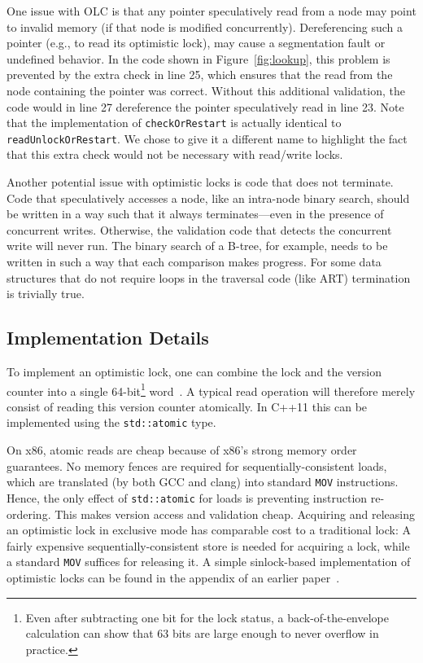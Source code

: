 \documentclass[11pt]{article}
\begin{document}
One issue with OLC is that any pointer speculatively read from a node may point to invalid memory (if that node is modified concurrently).
Dereferencing such a pointer (e.g., to read its optimistic lock), may cause a segmentation fault or undefined behavior.
In the code shown in Figure~\ref{fig:lookup}, this problem is prevented by the extra check in line 25, which ensures that the read from the node containing the pointer was correct.
Without this additional validation, the code would in line 27 dereference the pointer speculatively read in line 23.
Note that the implementation of \texttt{checkOrRestart} is actually identical to \texttt{readUnlockOrRestart}.
We chose to give it a different name to highlight the fact that this extra check would not be necessary with read/write locks.

Another potential issue with optimistic locks is code that does not terminate.
Code that speculatively accesses a node, like an intra-node binary search, should be written in a way such that it always terminates---even in the presence of concurrent writes.
Otherwise, the validation code that detects the concurrent write will never run.
The binary search of a B-tree, for example, needs to be written in such a way that each comparison makes progress.
For some data structures that do not require loops in the traversal code (like ART) termination is trivially true.

\subsection{Implementation Details}

To implement an optimistic lock, one can combine the lock and the version counter into a single 64-bit\footnote{Even after subtracting one bit for the lock status, a back-of-the-envelope calculation can show that 63 bits are large enough to never overflow in practice.} word~\cite{artsync}.
A typical read operation will therefore merely consist of reading this version counter atomically.
In C++11 this can be implemented using the \texttt{std::atomic} type.

On x86, atomic reads are cheap because of x86's strong memory order guarantees.
No memory fences are required for sequentially-consistent loads, which are translated (by both GCC and clang) into standard \texttt{MOV} instructions.
Hence, the only effect of \texttt{std::atomic} for loads is preventing instruction re-ordering.
This makes version access and validation cheap.
Acquiring and releasing an optimistic lock in exclusive mode has comparable cost to a traditional lock:
A fairly expensive sequentially-consistent store is needed for acquiring a lock, while a standard \texttt{MOV} suffices for releasing it.
A simple sinlock-based implementation of optimistic locks can be found in the appendix of an earlier paper~\cite{artsync}.
\end{document}
